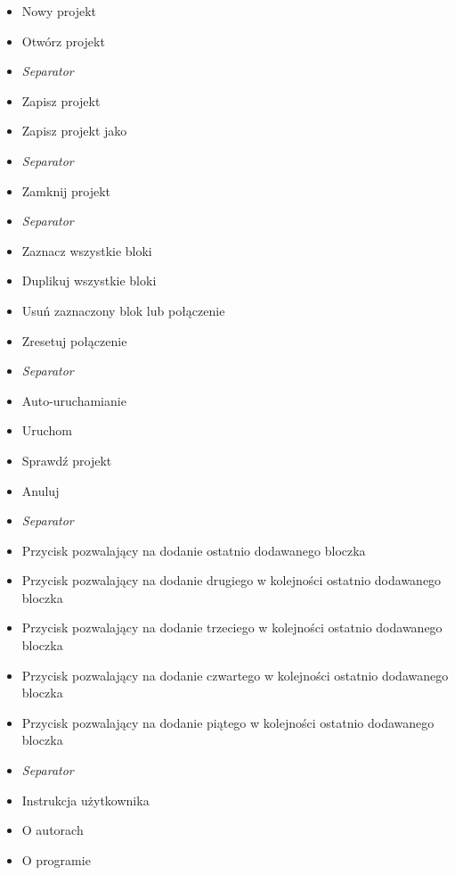 \documentclass[a4paper,10pt]{article}
\begin{document}
\begin{itemize}
 \item Nowy projekt
 \item Otwórz projekt
 \item \textit{Separator}
 \item Zapisz projekt
 \item Zapisz projekt jako
 \item \textit{Separator}
 \item Zamknij projekt
 \item \textit{Separator}
 \item Zaznacz wszystkie bloki
 \item Duplikuj wszystkie bloki
 \item Usuń zaznaczony blok lub połączenie
 \item Zresetuj połączenie
 \item \textit{Separator}
 \item Auto-uruchamianie
 \item Uruchom
 \item Sprawdź projekt
 \item Anuluj
 \item \textit{Separator}
 \item Przycisk pozwalający na dodanie ostatnio dodawanego bloczka
 \item Przycisk pozwalający na dodanie drugiego w kolejności ostatnio dodawanego bloczka
 \item Przycisk pozwalający na dodanie trzeciego w kolejności ostatnio dodawanego bloczka
 \item Przycisk pozwalający na dodanie czwartego w kolejności ostatnio dodawanego bloczka
 \item Przycisk pozwalający na dodanie piątego w kolejności ostatnio dodawanego bloczka
 \item \textit{Separator}
 \item Instrukcja użytkownika
 \item O autorach
 \item O programie
\end{itemize}
\end{document}
